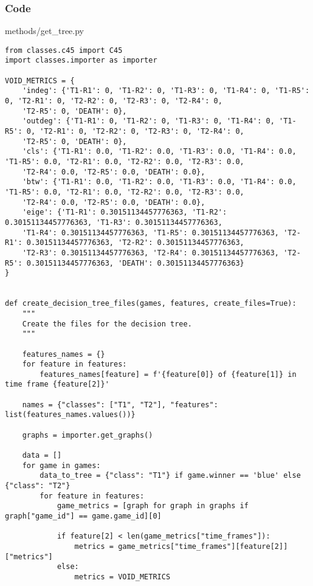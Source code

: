 \documentclass{beamer}
\begin{document}
\begin{frame}[fragile]
    \frametitle{Code}
    \scriptsize
    methods/get\_tree.py \newline
    \fontsize{3pt}{5pt}\selectfont
    \begin{verbatim}
from classes.c45 import C45
import classes.importer as importer

VOID_METRICS = {
    'indeg': {'T1-R1': 0, 'T1-R2': 0, 'T1-R3': 0, 'T1-R4': 0, 'T1-R5': 0, 'T2-R1': 0, 'T2-R2': 0, 'T2-R3': 0, 'T2-R4': 0,
    'T2-R5': 0, 'DEATH': 0},
    'outdeg': {'T1-R1': 0, 'T1-R2': 0, 'T1-R3': 0, 'T1-R4': 0, 'T1-R5': 0, 'T2-R1': 0, 'T2-R2': 0, 'T2-R3': 0, 'T2-R4': 0,
    'T2-R5': 0, 'DEATH': 0},
    'cls': {'T1-R1': 0.0, 'T1-R2': 0.0, 'T1-R3': 0.0, 'T1-R4': 0.0, 'T1-R5': 0.0, 'T2-R1': 0.0, 'T2-R2': 0.0, 'T2-R3': 0.0,
    'T2-R4': 0.0, 'T2-R5': 0.0, 'DEATH': 0.0},
    'btw': {'T1-R1': 0.0, 'T1-R2': 0.0, 'T1-R3': 0.0, 'T1-R4': 0.0, 'T1-R5': 0.0, 'T2-R1': 0.0, 'T2-R2': 0.0, 'T2-R3': 0.0,
    'T2-R4': 0.0, 'T2-R5': 0.0, 'DEATH': 0.0},
    'eige': {'T1-R1': 0.30151134457776363, 'T1-R2': 0.30151134457776363, 'T1-R3': 0.30151134457776363,
    'T1-R4': 0.30151134457776363, 'T1-R5': 0.30151134457776363, 'T2-R1': 0.30151134457776363, 'T2-R2': 0.30151134457776363,
    'T2-R3': 0.30151134457776363, 'T2-R4': 0.30151134457776363, 'T2-R5': 0.30151134457776363, 'DEATH': 0.30151134457776363}
}


def create_decision_tree_files(games, features, create_files=True):
    """
    Create the files for the decision tree.
    """
    
    features_names = {}
    for feature in features:
        features_names[feature] = f'{feature[0]} of {feature[1]} in time frame {feature[2]}'

    names = {"classes": ["T1", "T2"], "features": list(features_names.values())}

    graphs = importer.get_graphs()

    data = []
    for game in games:
        data_to_tree = {"class": "T1"} if game.winner == 'blue' else {"class": "T2"}
        for feature in features:
            game_metrics = [graph for graph in graphs if graph["game_id"] == game.game_id][0]

            if feature[2] < len(game_metrics["time_frames"]):
                metrics = game_metrics["time_frames"][feature[2]]["metrics"]
            else:
                metrics = VOID_METRICS
    \end{verbatim}
\end{frame}
\end{document}
